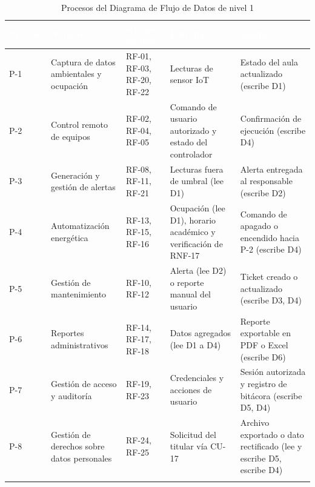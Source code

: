 \begingroup
\small
\begin{longtable}{|p{1.6cm}|p{3.4cm}|p{3.6cm}|p{3.1cm}|p{3.1cm}|}
\hline
\cellcolor{sigagreen}\textcolor{white}{\textbf{Proceso}} & \cellcolor{sigagreen}\textcolor{white}{\textbf{Nombre}} & \cellcolor{sigagreen}\textcolor{white}{\textbf{RF que agrupa}} & \cellcolor{sigagreen}\textcolor{white}{\textbf{Entrada}} & \cellcolor{sigagreen}\textcolor{white}{\textbf{Salida}} \\ \hline
P-1 & Captura de datos ambientales y ocupación & RF-01, RF-03, RF-20, RF-22 & Lecturas de sensor IoT & Estado del aula actualizado (escribe D1) \\ \hline
P-2 & Control remoto de equipos & RF-02, RF-04, RF-05 & Comando de usuario autorizado y estado del controlador & Confirmación de ejecución (escribe D4) \\ \hline
P-3 & Generación y gestión de alertas & RF-08, RF-11, RF-21 & Lecturas fuera de umbral (lee D1) & Alerta entregada al responsable (escribe D2) \\ \hline
P-4 & Automatización energética & RF-13, RF-15, RF-16 & Ocupación (lee D1), horario académico y verificación de RNF-17 & Comando de apagado o encendido hacia P-2 (escribe D4) \\ \hline
P-5 & Gestión de mantenimiento & RF-10, RF-12 & Alerta (lee D2) o reporte manual del usuario & Ticket creado o actualizado (escribe D3, D4) \\ \hline
P-6 & Reportes administrativos & RF-14, RF-17, RF-18 & Datos agregados (lee D1 a D4) & Reporte exportable en PDF o Excel (escribe D6) \\ \hline
P-7 & Gestión de acceso y auditoría & RF-19, RF-23 & Credenciales y acciones de usuario & Sesión autorizada y registro de bitácora (escribe D5, D4) \\ \hline
P-8 & Gestión de derechos sobre datos personales & RF-24, RF-25 & Solicitud del titular vía CU-17 & Archivo exportado o dato rectificado (lee y escribe D5, escribe D4) \\ \hline
\caption{Procesos del Diagrama de Flujo de Datos de nivel 1}
\end{longtable}
\endgroup

